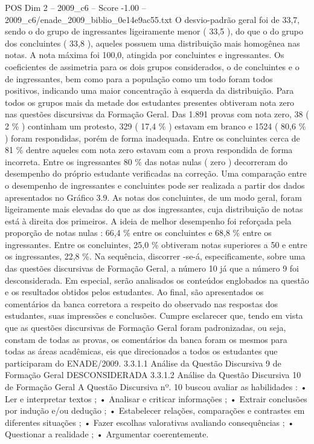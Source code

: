 \begin{textsample}{POS Dim 2 – 2009\_c6 – Score -1.00 – 2009\_c6/enade\_2009\_biblio\_0e14e9ac55.txt}
O desvio-padrão geral foi de 33,7, sendo o do grupo de ingressantes ligeiramente menor ( 33,5 ), do que o do grupo dos concluintes ( 33,8 ), aqueles possuem uma distribuição mais homogênea nas notas.
A nota máxima foi 100,0, atingida por concluintes e ingressantes.
Os coeficientes de assimetria para os dois grupos considerados, o de concluintes e o de ingressantes, bem como para a população como um todo foram todos positivos, indicando uma maior concentração à esquerda da distribuição.
Para todos os grupos mais da metade dos estudantes presentes obtiveram nota zero nas questões discursivas da Formação Geral.
Das 1.891 provas com nota zero, 38 ( 2 \% ) continham um protesto, 329 ( 17,4 \% ) estavam em branco e 1524 ( 80,6 \% ) foram respondidas, porém de forma inadequada.
Entre os concluintes cerca de 81 \% dentre aqueles com nota zero estavam com a prova respondida de forma incorreta.
Entre os ingressantes 80 \% das notas nulas ( zero ) decorreram do desempenho do próprio estudante verificadas na correção.
Uma comparação entre o desempenho de ingressantes e concluintes pode ser realizada a partir dos dados apresentados no Gráfico 3.9.
As notas dos concluintes, de um modo geral, foram ligeiramente mais elevadas do que as dos ingressantes, cuja distribuição de notas está à direita dos primeiros.
A ideia de melhor desempenho foi reforçada pela proporção de notas nulas : 66,4 \% entre os concluintes e 68,8 \% entre os ingressantes.
Entre os concluintes, 25,0 \% obtiveram notas superiores a 50 e entre os ingressantes, 22,8 \%.
Na sequência, discorrer -se-á, especificamente, sobre uma das questões discursivas de Formação Geral, a número 10 já que a número 9 foi desconsiderada.
Em especial, serão analisados os conteúdos englobados na questão e os resultados obtidos pelos estudantes.
Ao final, são apresentados os comentários da banca corretora a respeito do observado nas respostas dos estudantes, suas impressões e conclusões.
Cumpre esclarecer que, tendo em vista que as questões discursivas de Formação Geral foram padronizadas, ou seja, constam de todas as provas, os comentários da banca foram os mesmos para todas as áreas acadêmicas, eis que direcionados a todos os estudantes que participaram do ENADE/2009. 3.3.1.1 Análise da Questão Discursiva 9 de Formação Geral DESCONSIDERADA 3.3.1.2 Análise da Questão Discursiva 10 de Formação Geral A Questão Discursiva nº. 10 buscou avaliar as habilidades : • Ler e interpretar textos ; • Analisar e criticar informações ; • Extrair conclusões por indução e/ou dedução ; • Estabelecer relações, comparações e contrastes em diferentes situações ; • Fazer escolhas valorativas avaliando consequências ; • Questionar a realidade ; • Argumentar coerentemente.

\end{textsample}
